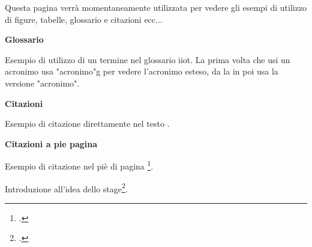 Questa pagina verrà momentaneamente utilizzata per vedere gli esempi di utilizzo di figure, tabelle, glossario e citazioni ecc...
\\
\vspace{3cm}

\textbf{Glossario}

Esempio di utilizzo di un termine nel glossario \gls{iiot}.
La prima volta che usi un acronimo usa "acronimo"g per vedere l'acronimo esteso, da la in poi usa la versione "acronimo".

\textbf{Citazioni}

Esempio di citazione direttamente nel testo \cite{site:agile-manifesto}.

\textbf{Citazioni a pie pagina}

Esempio di citazione nel piè di pagina \footcite{womak:lean-thinking}.

Introduzione all'idea dello stage\footcite{article:spooky}.